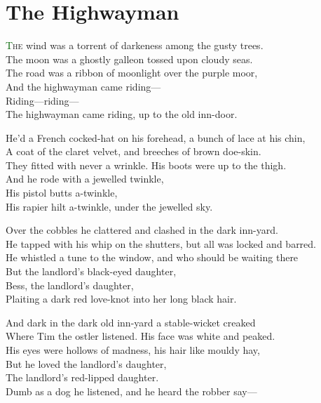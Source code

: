\documentclass[oneside,12pt,english]{book}
\newcommand*\initfamily{\usefont{U}{Acorn}{xl}{n}}
\begin{document}
\begin{titlepage}
  
  \thispagestyle{empty}
\end{titlepage}


\newpage
\setcounter{page}{3}

\section*{The Highwayman}

\Large
\lettrine[lines=3]{\initfamily\textcolor{darkgreen}{T}}{he} wind was a torrent
of darkeness among the gusty trees.\\
The moon was a ghostly galleon tossed upon cloudy seas.\\
The road was a ribbon of moonlight over the purple moor,\\
And the highwayman came riding---\\
Riding---riding---\\
The highwayman came riding, up to the old inn-door.


He’d a French cocked-hat on his forehead, a bunch of lace at his chin,\\
A coat of the claret velvet, and breeches of brown doe-skin.\\
They fitted with never a wrinkle. His boots were up to the thigh.\\
And he rode with a jewelled twinkle,\\
His pistol butts a-twinkle,\\
His rapier hilt a-twinkle, under the jewelled sky.


Over the cobbles he clattered and clashed in the dark inn-yard.\\
He tapped with his whip on the shutters, but all was locked and barred.\\
He whistled a tune to the window, and who should be waiting there\\
But the landlord’s black-eyed daughter,\\
Bess, the landlord’s daughter,\\
Plaiting a dark red love-knot into her long black hair.


And dark in the dark old inn-yard a stable-wicket creaked\\
Where Tim the ostler listened. His face was white and peaked.\\
His eyes were hollows of madness, his hair like mouldy hay,\\
But he loved the landlord’s daughter,\\
The landlord’s red-lipped daughter.\\
Dumb as a dog he listened, and he heard the robber say---
\end{document}
